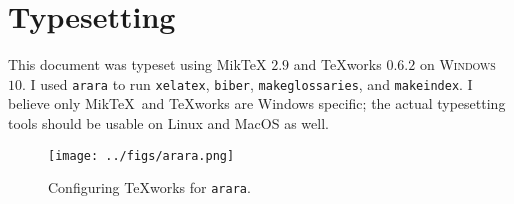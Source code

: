 \chapter{Typesetting}

This document was typeset using Mik\TeX{} $2.9$ \cite{Miktex2017} 
and {\TeX}works $0.6.2$ \cite{Texworks2017} 
on \textsc{Windows} $10$. 
I used \texttt{arara} \cite{arara2017} 
to run \texttt{xelatex}, \texttt{biber}, \texttt{makeglossaries},  and
\texttt{makeindex}.
I believe only Mik\TeX\  and {\TeX}works are Windows specific; 
the actual typesetting tools should be usable on Linux and MacOS as well.

\begin{figure}[htbp]
\centering
\texttt{[image: ../figs/arara.png]}
\caption{Configuring {\TeX}works for \texttt{arara}.}
\label{fig:arara}
\end{figure}
